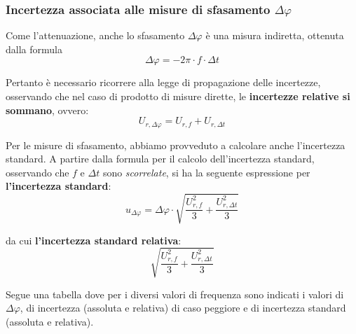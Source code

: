 \FloatBarrier
\clearpage


\subsubsection*{Incertezza associata alle misure di sfasamento $\Delta \varphi$}


Come l'attenuazione, anche lo sfasamento $\Delta \varphi$ è una misura indiretta, ottenuta dalla formula
\[\Delta \varphi =  -2\pi \cdot f \cdot \Delta t  \]

Pertanto è necessario ricorrere alla legge di propagazione delle incertezze, osservando che nel caso di prodotto di misure dirette, le \textbf{incertezze relative si sommano}, ovvero:
\[U_{r,\Delta \varphi} = U_{r,f} + U_{r,\Delta t}\]

Per le misure di sfasamento, abbiamo provveduto a calcolare anche l'incertezza standard. A partire dalla formula per il calcolo dell'incertezza standard, osservando che $f$ e $\Delta t$ sono \emph{scorrelate}, si ha la seguente espressione per \textbf{l'incertezza standard}:
\[u_{\Delta \varphi} = \Delta\varphi \cdot \sqrt{\frac{U_{r,f}^2}{3}+ \frac{U_{r,\Delta t}^2}{3}}\]

da cui\textbf{ l'incertezza standard relativa}:
\[\sqrt{\frac{U_{r,f}^2}{3}+ \frac{U_{r,\Delta t}^2}{3}}\]

Segue una tabella dove per i diversi valori di frequenza sono indicati i valori di $\Delta\varphi$, di incertezza (assoluta e relativa) di caso peggiore e di incertezza standard (assoluta e relativa).

